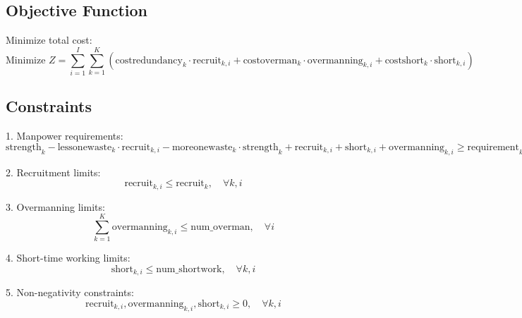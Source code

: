\documentclass{article}
\begin{document}
\subsection*{Objective Function}
Minimize total cost:
\[
\text{Minimize } Z = \sum_{i=1}^{I} \sum_{k=1}^{K} \left( \text{costredundancy}_{k} \cdot \text{recruit}_{k, i} + \text{costoverman}_{k} \cdot \text{overmanning}_{k, i} + \text{costshort}_{k} \cdot \text{short}_{k, i} \right)
\]

\subsection*{Constraints}
1. Manpower requirements:
\[
\text{strength}_{k} - \text{lessonewaste}_{k} \cdot \text{recruit}_{k, i} - \text{moreonewaste}_{k} \cdot \text{strength}_{k} + \text{recruit}_{k, i} + \text{short}_{k, i} + \text{overmanning}_{k, i} \geq \text{requirement}_{k, i}, \quad \forall k, i
\]

2. Recruitment limits:
\[
\text{recruit}_{k, i} \leq \text{recruit}_{k}, \quad \forall k, i
\]

3. Overmanning limits:
\[
\sum_{k=1}^{K} \text{overmanning}_{k, i} \leq \text{num\_overman}, \quad \forall i
\]

4. Short-time working limits:
\[
\text{short}_{k, i} \leq \text{num\_shortwork}, \quad \forall k, i
\]

5. Non-negativity constraints:
\[
\text{recruit}_{k, i}, \text{overmanning}_{k, i}, \text{short}_{k, i} \geq 0, \quad \forall k, i
\]
\end{document}
